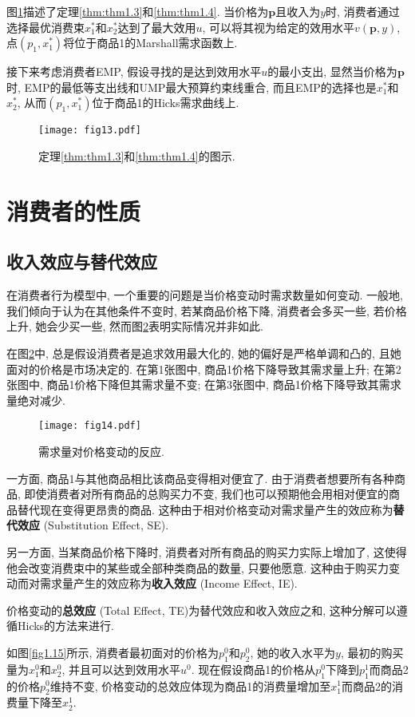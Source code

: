 \documentclass[cn, 12pt, math=mtpro2, bibstyle=apa, blue, twocol]{elegantbook}
\newcommand{\p}{\mathbf{p}}
\begin{document}
图\ref{fig1.13}描述了定理\ref{thm:thm1.3}和\ref{thm:thm1.4}. 当价格为$\p$且收入为$y$时, 消费者通过选择最优消费束$x_1^\ast$和$x_2^\ast$达到了最大效用$u$, 可以将其视为给定的效用水平$v(\p,y)$, 点$(p_1,x^\ast_1)$将位于商品1的Marshall需求函数上.

接下来考虑消费者EMP, 假设寻找的是达到效用水平$u$的最小支出, 显然当价格为$\p$时, EMP的最低等支出线和UMP最大预算约束线重合, 而且EMP的选择也是$x_1^\ast$和$x_2^\ast$, 从而$(p_1,x_1^\ast)$位于商品1的Hicks需求曲线上.
\begin{figure}[htbp!]
  \centering
  \texttt{[image: fig13.pdf]}
  \caption{定理\ref{thm:thm1.3}和\ref{thm:thm1.4}的图示.}\label{fig1.13}
\end{figure}
\newpage
\section{消费者的性质}
\subsection{收入效应与替代效应}
在消费者行为模型中, 一个重要的问题是当价格变动时需求数量如何变动. 一般地, 我们倾向于认为在其他条件不变时, 若某商品价格下降, 消费者会多买一些, 若价格上升, 她会少买一些, 然而图\ref{fig1.14}表明实际情况并非如此.

在图\ref{fig1.14}中, 总是假设消费者是追求效用最大化的, 她的偏好是严格单调和凸的, 且她面对的价格是市场决定的. 在第1张图中, 商品1价格下降导致其需求量上升; 在第2张图中, 商品1价格下降但其需求量不变; 在第3张图中, 商品1价格下降导致其需求量绝对减少.
\begin{figure}[htbp!]
  \centering
  \texttt{[image: fig14.pdf]}
  \caption{需求量对价格变动的反应.}\label{fig1.14}
\end{figure}

一方面, 商品1与其他商品相比该商品变得相对便宜了. 由于消费者想要所有各种商品, 即使消费者对所有商品的总购买力不变, 我们也可以预期他会用相对便宜的商品替代现在变得更昂贵的商品. 这种由于相对价格变动对需求量产生的效应称为\textbf{替代效应} (Substitution Effect, SE).

另一方面, 当某商品价格下降时, 消费者对所有商品的购买力实际上增加了, 这使得他会改变消费束中的某些或全部种类商品的数量, 只要他愿意. 这种由于购买力变动而对需求量产生的效应称为\textbf{收入效应} (Income Effect, IE).

价格变动的\textbf{总效应} (Total Effect, TE)为替代效应和收入效应之和, 这种分解可以遵循Hicks的方法来进行.

如图\ref{fig1.15}所示, 消费者最初面对的价格为$p_1^0$和$p_2^0$, 她的收入水平为$y$, 最初的购买量为$x_1^0$和$x_2^0$, 并且可以达到效用水平$u^0$. 现在假设商品1的价格从$p_1^0$下降到$p_1^1$而商品2的价格$p_2^0$维持不变, 价格变动的总效应体现为商品1的消费量增加至$x_1^1$而商品2的消费量下降至$x_2^1$.
\end{document}
